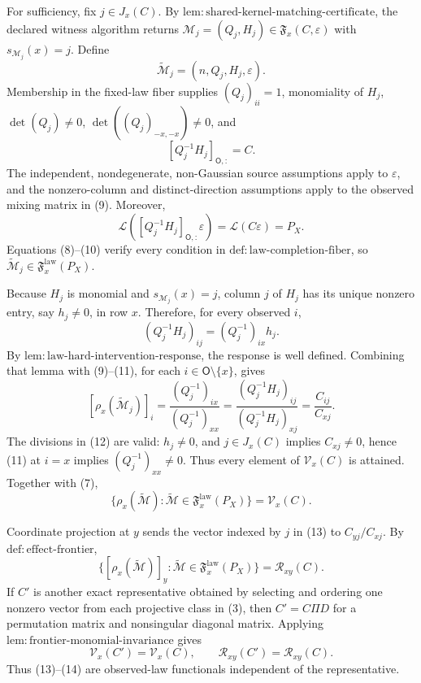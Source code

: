 {{For sufficiency, fix \(j\in J_x(C)\). By \(\mathrm{lem:shared\text{-}kernel\text{-}matching\text{-}certificate}\), the declared witness algorithm returns \(\mathcal M_j=(Q_j,H_j)\in\mathfrak F_x(C,\varepsilon)\) with \(s_{\mathcal M_j}(x)=j\). Define
\[
 \widetilde{\mathcal M}_j=(n,Q_j,H_j,\varepsilon). \tag{8}
\]
Membership in the fixed-law fiber supplies \((Q_j)_{ii}=1\), monomiality of \(H_j\), \(\det(Q_j)\ne0\), \(\det((Q_j)_{-x,-x})\ne0\), and
\[
 [Q_j^{-1}H_j]_{\mathsf O,:}=C. \tag{9}
\]
The independent, nondegenerate, non-Gaussian source assumptions apply to \(\varepsilon\), and the nonzero-column and distinct-direction assumptions apply to the observed mixing matrix in (9). Moreover,
\[
 \mathcal L([Q_j^{-1}H_j]_{\mathsf O,:}\varepsilon)
 =\mathcal L(C\varepsilon)=P_X. \tag{10}
\]
Equations (8)--(10) verify every condition in \(\mathrm{def:law\text{-}completion\text{-}fiber}\), so \(\widetilde{\mathcal M}_j\in\mathfrak F_x^{\mathrm{law}}(P_X)\).

Because \(H_j\) is monomial and \(s_{\mathcal M_j}(x)=j\), column \(j\) of \(H_j\) has its unique nonzero entry, say \(h_j\ne0\), in row \(x\). Therefore, for every observed \(i\),
\[
 (Q_j^{-1}H_j)_{ij}=(Q_j^{-1})_{ix}h_j. \tag{11}
\]
By \(\mathrm{lem:law\text{-}hard\text{-}intervention\text{-}response}\), the response is well defined. Combining that lemma with (9)--(11), for each \(i\in\mathsf O\setminus\{x\}\), gives
\[
 [\rho_x(\widetilde{\mathcal M}_j)]_i
 =\frac{(Q_j^{-1})_{ix}}{(Q_j^{-1})_{xx}}
 =\frac{(Q_j^{-1}H_j)_{ij}}{(Q_j^{-1}H_j)_{xj}}
 =\frac{C_{ij}}{C_{xj}}. \tag{12}
\]
The divisions in (12) are valid: \(h_j\ne0\), and \(j\in J_x(C)\) implies \(C_{xj}\ne0\), hence (11) at \(i=x\) implies \((Q_j^{-1})_{xx}\ne0\). Thus every element of \(\mathcal V_x(C)\) is attained. Together with (7),
\[
 \{\rho_x(\widetilde{\mathcal M}):\widetilde{\mathcal M}\in\mathfrak F_x^{\mathrm{law}}(P_X)\}
 =\mathcal V_x(C). \tag{13}
\]

Coordinate projection at \(y\) sends the vector indexed by \(j\) in (13) to \(C_{yj}/C_{xj}\). By \(\mathrm{def:effect\text{-}frontier}\),
\[
 \{[\rho_x(\widetilde{\mathcal M})]_y:\widetilde{\mathcal M}\in\mathfrak F_x^{\mathrm{law}}(P_X)\}
 =\mathcal R_{xy}(C). \tag{14}
\]
If \(C'\) is another exact representative obtained by selecting and ordering one nonzero vector from each projective class in (3), then \(C'=C\Pi D\) for a permutation matrix and nonsingular diagonal matrix. Applying \(\mathrm{lem:frontier\text{-}monomial\text{-}invariance}\) gives
\[
 \mathcal V_x(C')=\mathcal V_x(C),
 \qquad
 \mathcal R_{xy}(C')=\mathcal R_{xy}(C). \tag{15}
\]
Thus (13)--(14) are observed-law functionals independent of the representative.

}}
